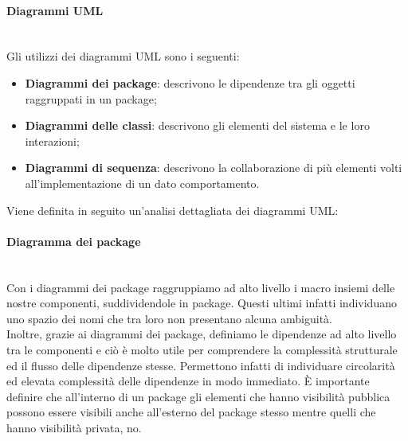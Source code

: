 			\paragraph*{Diagrammi UML}\mbox{}\\ [1mm]
			Gli utilizzi dei diagrammi UML sono i seguenti:
			\begin{itemize}
				\item \textbf{Diagrammi dei package}: descrivono le dipendenze tra gli oggetti raggruppati in un package;
				\item \textbf{Diagrammi delle classi}: descrivono gli elementi del sistema e le loro interazioni;
				\item \textbf{Diagrammi di sequenza}: descrivono la collaborazione di più elementi volti all'implementazione di un dato comportamento.
			\end{itemize}
			Viene definita in seguito un'analisi dettagliata dei diagrammi UML:
			\paragraph*{Diagramma dei package}\mbox{}\\ [1mm]
			Con i diagrammi dei package raggruppiamo ad alto livello i macro insiemi delle nostre componenti, suddividendole in package. Questi ultimi infatti individuano uno spazio dei nomi che tra loro non presentano alcuna ambiguità. \\
			Inoltre, grazie ai diagrammi dei package, definiamo le dipendenze ad alto livello tra le componenti e ciò è molto utile per comprendere la complessità strutturale ed il flusso delle dipendenze stesse. Permettono infatti di individuare circolarità ed elevata complessità delle dipendenze in modo immediato.
			È importante definire che all'interno di un package gli elementi che hanno visibilità pubblica possono essere visibili anche all'esterno del package stesso mentre quelli che hanno visibilità privata, no.
